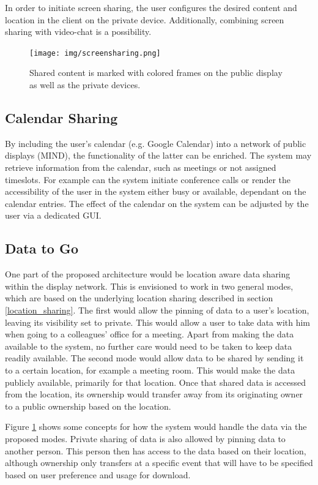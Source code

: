 In order to initiate screen sharing, the user configures the desired content and location in the client on the private device.
Additionally, combining screen sharing with video-chat is a possibility.

\begin{figure}
	\centering
	\texttt{[image: img/screensharing.png]}
	\caption[Screen Sharing]{Shared content is marked with colored frames on the public display as well as the private devices.}
	\label{data_share_sequence}
\end{figure}

\subsection{Calendar Sharing}

By including the user’s calendar (e.g. Google Calendar) into a network of public displays (MIND), the functionality of the latter can be enriched.
The system may retrieve information from the calendar, such as meetings or not assigned timeslots.
For example can the system initiate conference calls or render the accessibility of the user in the system either busy or available, dependant on the calendar entries.
The effect of the calendar on the system can be adjusted by the user via a dedicated GUI.

\subsection{Data to Go}
\label{data2go}

One part of the proposed architecture would be location aware data sharing within the display network.
This is envisioned to work in two general modes, which are based on the underlying location sharing described in section \ref{location_sharing}.
The first would allow the pinning of data to a user's location, leaving its visibility set to private.
This would allow a user to take data with him when going to a colleagues' office for a meeting.
Apart from making the data available to the system, no further care would need to be taken to keep data readily available.
The second mode would allow data to be shared by sending it to a certain location, for example a meeting room.
This would make the data publicly available, primarily for that location.
Once that shared data is accessed from the location, its ownership would transfer away from its originating owner to a public ownership based on the location.

Figure \ref{data_share_sequence} shows some concepts for how the system would handle the data via the proposed modes.
Private sharing of data is also allowed by pinning data to another person.
This person then has access to the data based on their location, although ownership only transfers at a specific event that will have to be specified based on user preference and usage for download.

